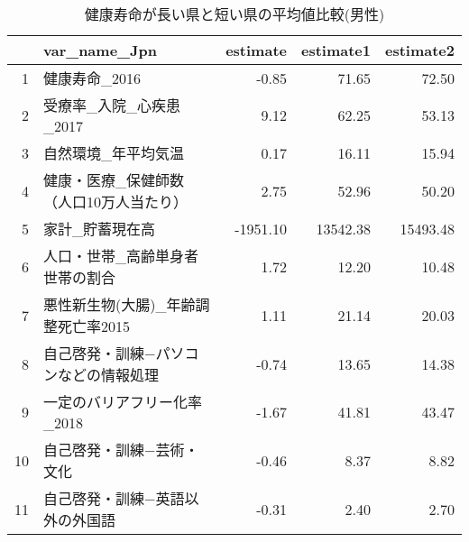 \begin{table}[ht]
\centering
\caption{健康寿命が長い県と短い県の平均値比較(男性)} 
\label{HLE_Ttest_d_m.tex}
\begingroup\tiny
\begin{tabular}{rlrrr}
  \hline
 & var\_name\_Jpn & estimate & estimate1 & estimate2 \\ 
  \hline
1 & 健康寿命\_2016 & -0.85 & 71.65 & 72.50 \\ 
  2 & 受療率\_入院\_心疾患\_2017 & 9.12 & 62.25 & 53.13 \\ 
  3 & 自然環境\_年平均気温 & 0.17 & 16.11 & 15.94 \\ 
  4 & 健康・医療\_保健師数（人口10万人当たり） & 2.75 & 52.96 & 50.20 \\ 
  5 & 家計\_貯蓄現在高 & -1951.10 & 13542.38 & 15493.48 \\ 
  6 & 人口・世帯\_高齢単身者世帯の割合 & 1.72 & 12.20 & 10.48 \\ 
  7 & 悪性新生物(大腸)\_年齢調整死亡率2015 & 1.11 & 21.14 & 20.03 \\ 
  8 & 自己啓発・訓練−パソコンなどの情報処理 & -0.74 & 13.65 & 14.38 \\ 
  9 & 一定のバリアフリー化率\_2018 & -1.67 & 41.81 & 43.47 \\ 
  10 & 自己啓発・訓練−芸術・文化 & -0.46 & 8.37 & 8.82 \\ 
  11 & 自己啓発・訓練−英語以外の外国語 & -0.31 & 2.40 & 2.70 \\ 
   \hline
\end{tabular}
\endgroup
\end{table}
